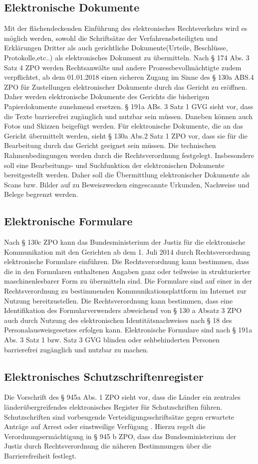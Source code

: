 \subsection*{Elektronische Dokumente}
Mit der flächendeckenden Einführung des elektronisches Rechtsverkehrs wird es möglich werden, sowohl die Schriftsätze der Verfahrensbeteiligten und Erklärungen Dritter als auch gerichtliche Dokumente(Urteile, Beschlüsse, Protokolle,etc..) als elektronisches Dokument zu übermitteln. Nach § 174 Abs. 3 Satz 4 ZPO werden Rechtsanwälte und andere Prozessbevollmächtigte zudem verpflichtet, ab dem 01.01.2018 einen sicheren Zugang im Sinne des § 130a ABS.4 ZPO für Zustellungen elektronischer Dokumente durch das Gericht zu eröffnen. Daher werden elektronische Dokumente des Gerichts die bisherigen Papierdokumente zunehmend ersetzen. § 191a ABs. 3 Satz 1 GVG sieht vor, dass die Texte barrierefrei zugänglich und nutzbar sein müssen. Daneben können auch Fotos und Skizzen beigefügt werden. Für elektronische Dokumente, die an das Gericht übermittelt werden, sieht § 130a Abs.2 Satz 1 ZPO vor, dass sie für die Bearbeitung durch das Gericht geeignet sein müssen. Die technischen Rahmenbedingungen werden durch die Rechtsverordnung festgelegt. Insbesondere soll eine Bearbeitungs- und Suchfunktion der elektronischen Dokumente bereitgestellt werden. Daher soll die Übermittlung elektronischer Dokumente als Scans bzw. Bilder auf zu Beweiszwecken eingescannte Urkunden, Nachweise und Belege begrenzt werden. 
\subsection*{Elektronische Formulare}
Nach § 130c ZPO kann das Bundesministerium der Justiz für die elektronische Kommunikation mit den Gerichten ab dem 1. Juli 2014 durch Rechtsverordnung elektronische Formulare einführen. Die Rechtsverordnung kann bestimmen, dass die in den Formularen enthaltenen Angaben ganz oder teilweise in strukturierter maschinenlesbarer Form zu übermitteln sind. Die Formulare sind auf einer in der Rechtsverordnung zu bestimmenden Kommunikationsplattform im Internet zur Nutzung bereitzustellen.  Die Rechtsverordnung kann bestimmen, dass eine Identifikation des Formularverwenders abweichend von § 130 a Absatz 3 ZPO auch durch Nutzung des elektronischen Identitätsnachweises nach § 18 des Personalausweisgesetzes erfolgen kann. Elektronische Formulare sind nach § 191a Abs. 3 Satz 1 bzw. Satz 3 GVG blinden oder sehbehinderten Personen barrierefrei zugänglich und nutzbar zu machen.
\subsection*{Elektronisches Schutzschriftenregister}
Die Vorschrift des § 945a Abs. 1 ZPO sieht vor, dass die Länder ein zentrales länderübergreifendes elektronisches Register für Schutzschriften führen. Schutzschriften sind vorbeugende Verteidigungsschriftsätze gegen erwartete Anträge auf Arrest oder einstweilige Verfügung . Hierzu regelt die Verordnungsermächtigung in § 945 b ZPO, dass das Bundesministerium der Justiz durch Rechtsverordnung die näheren Bestimmungen über die Barrierefreiheit festlegt.

